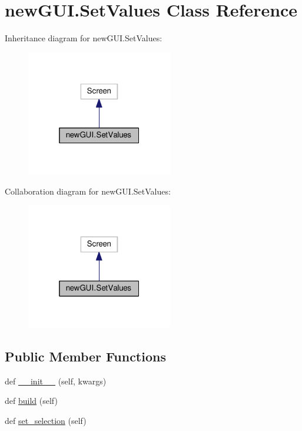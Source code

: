 \hypertarget{classnewGUI_1_1SetValues}{}\section{new\+G\+U\+I.\+Set\+Values Class Reference}
\label{classnewGUI_1_1SetValues}


Inheritance diagram for new\+G\+U\+I.\+Set\+Values\+:
\nopagebreak
\begin{figure}[H]
\begin{center}
\leavevmode
\includegraphics[width=181pt]{classnewGUI_1_1SetValues__inherit__graph}
\end{center}
\end{figure}


Collaboration diagram for new\+G\+U\+I.\+Set\+Values\+:
\nopagebreak
\begin{figure}[H]
\begin{center}
\leavevmode
\includegraphics[width=181pt]{classnewGUI_1_1SetValues__coll__graph}
\end{center}
\end{figure}
\subsection*{Public Member Functions}
\begin{DoxyCompactItemize}
\item 
def \hyperlink{classnewGUI_1_1SetValues_a87f51c45a17d725a633c91009545f48d}{\+\_\+\+\_\+init\+\_\+\+\_\+} (self, kwargs)
\item 
def \hyperlink{classnewGUI_1_1SetValues_a120cf308a18748a9f3bf0b53e37a1515}{build} (self)
\item 
def \hyperlink{classnewGUI_1_1SetValues_aa73b14246d4537dfe4fd78c7c68d1217}{set\+\_\+selection} (self)
\end{DoxyCompactItemize}
